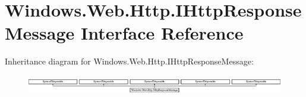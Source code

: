 \hypertarget{interface_windows_1_1_web_1_1_http_1_1_i_http_response_message}{}\section{Windows.\+Web.\+Http.\+I\+Http\+Response\+Message Interface Reference}
\label{interface_windows_1_1_web_1_1_http_1_1_i_http_response_message}
Inheritance diagram for Windows.\+Web.\+Http.\+I\+Http\+Response\+Message\+:\begin{figure}[H]
\begin{center}
\leavevmode
\includegraphics[height=0.861538cm]{interface_windows_1_1_web_1_1_http_1_1_i_http_response_message}
\end{center}
\end{figure}
